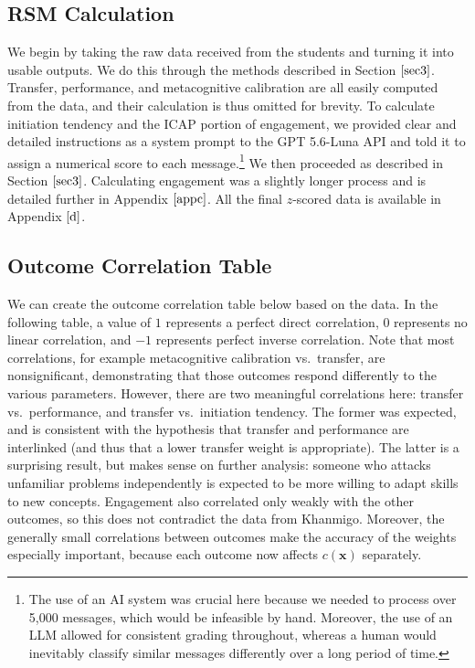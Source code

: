 \documentclass[12pt]{article}
\newcommand{\m}[1]{\mathbf{#1}}
\begin{document}
\subsection{RSM Calculation}
We begin by taking the raw data received from the students and turning it into usable outputs. We do this through the methods described in Section $\ref{sec3}$. Transfer, performance, and metacognitive calibration are all easily computed from the data, and their calculation is thus omitted for brevity. To calculate initiation tendency and the ICAP portion of engagement, we provided clear and detailed instructions as a system prompt to the GPT 5.6-Luna API and told it to assign a numerical score to each message.\footnote{The use of an AI system was crucial here because we needed to process over 5,000 messages, which would be infeasible by hand. Moreover, the use of an LLM allowed for consistent grading throughout, whereas a human would inevitably classify similar messages differently over a long period of time.} We then proceeded as described in Section $\ref{sec3}$. Calculating engagement was a slightly longer process and is detailed further in Appendix $\ref{appc}$. All the final $z$-scored data is available in Appendix $\ref{d}$.

\subsection{Outcome Correlation Table}
We can create the outcome correlation table below based on the data. In the following table, a value of $1$ represents a perfect direct correlation, $0$ represents no linear correlation, and $-1$ represents perfect inverse correlation. Note that most correlations, for example metacognitive calibration vs.\ transfer, are nonsignificant, demonstrating that those outcomes respond differently to the various parameters. However, there are two meaningful correlations here: transfer vs.\ performance, and transfer vs.\ initiation tendency. The former was expected, and is consistent with the hypothesis that transfer and performance are interlinked (and thus that a lower transfer weight is appropriate). The latter is a surprising result, but makes sense on further analysis: someone who attacks unfamiliar problems independently is expected to be more willing to adapt skills to new concepts. Engagement also correlated only weakly with the other outcomes, so this does not contradict the data from Khanmigo. Moreover, the generally small correlations between outcomes make the accuracy of the weights especially important, because each outcome now affects $c (\m x)$ separately.
\end{document}
